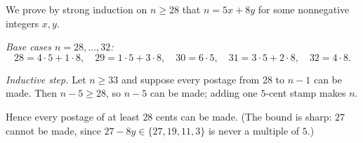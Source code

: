 We prove by strong induction on $n\ge28$ that $n=5x+8y$ for some nonnegative integers $x,y$.

\emph{Base cases $n=28,\dots,32$:}
\[
28=4\cdot5+1\cdot8,\quad 29=1\cdot5+3\cdot8,\quad 30=6\cdot5,\quad 31=3\cdot5+2\cdot8,\quad 32=4\cdot8 .
\]

\emph{Inductive step.} Let $n\ge33$ and suppose every postage from $28$ to $n-1$ can be made. Then $n-5\ge28$, so $n-5$ can be made; adding one $5$-cent stamp makes $n$.

Hence every postage of at least $28$ cents can be made. (The bound is sharp: $27$ cannot be made, since $27-8y\in\{27,19,11,3\}$ is never a multiple of $5$.)
